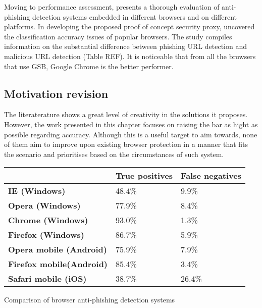 Moving to performance assessment, \cite{SECURITY_BUSTERS} presents a thorough evaluation of anti-phishing detection systems embedded in different browsers and on different platforms. In developing the proposed proof of concept security proxy, \cite{SECURITY_BUSTERS} uncovered the classification accuracy issues of popular browsers. The study compiles information on the substantial difference between phishing URL detection and malicious URL detection (Table REF). It is noticeable that from all the browsers that use GSB, Google Chrome is the better performer.

\subsection{Motivation revision}
The literaterature shows a great level of creativity in the solutions it proposes. However, the work presented in this chapter focuses on raising the bar as hight as possible regarding accuracy. Although this is a useful target to aim towards, none of them aim to improve upon existing browser protection in a manner that fits the scenario and prioritises based on the circumstances of such system.

\begin{center}
	\footnotesize
	\label{tab:OPTIMISED_MODELS}
	\begin{tabularx}{\textwidth}{ | X | X | X | }
		\hline
		                                 & \textbf{True positives} & \textbf{False negatives} \\
		\hline
		\textbf{IE (Windows)}            & 48.4\%                  & 9.9\%                    \\
		\hline
		\textbf{Opera (Windows)}         & 77.9\%                  & 8.4\%                    \\
		\hline
		\textbf{Chrome (Windows)}        & 93.0\%                  & 1.3\%                    \\
		\hline
		\textbf{Firefox (Windows)}       & 86.7\%                  & 5.9\%                    \\
		\hline
		\textbf{Opera mobile (Android)}  & 75.9\%                  & 7.9\%                    \\
		\hline
		\textbf{Firefox mobile(Android)} & 85.4\%                  & 3.4\%                    \\
		\hline
		\textbf{Safari mobile (iOS)}     & 38.7\%                  & 26.4\%                   \\
		\hline
	\end{tabularx}
	\captionsetup{type=table}\caption{Comparison of browser anti-phishing detection systems \citep{INTELLIGENT_PHISHING_ANFIS}}
\end{center}


